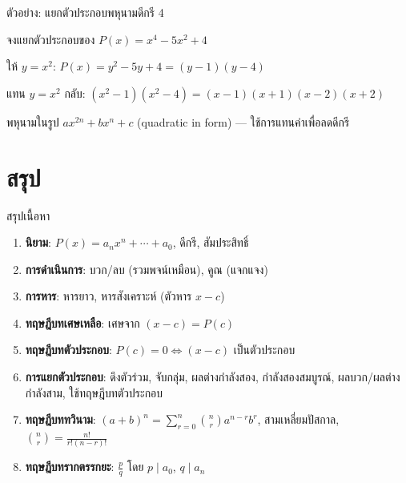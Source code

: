 \documentclass[11pt, aspectratio=169]{beamer}
\begin{document}
\begin{frame}{ตัวอย่าง: แยกตัวประกอบพหุนามดีกรี 4}
  \begin{exambox}[โจทย์]
    จงแยกตัวประกอบของ $P(x) = x^4 - 5x^2 + 4$
  \end{exambox}

  \begin{solbox}[วิธีทำ]
    ให้ $y = x^2$: \quad $P(x) = y^2 - 5y + 4 = (y-1)(y-4)$

    แทน $y = x^2$ กลับ: \quad $(x^2-1)(x^2-4) = (x-1)(x+1)(x-2)(x+2)$

  \end{solbox}

  \begin{intuition}[เทคนิค]
    พหุนามในรูป $ax^{2n} + bx^n + c$ (quadratic in form) — ใช้การแทนค่าเพื่อลดดีกรี
  \end{intuition}
\end{frame}

\section{สรุป}

\begin{frame}{สรุปเนื้อหา}
  \begin{explanation}[สิ่งที่ได้เรียนรู้]
    \begin{enumerate}
      \item \textbf{นิยาม}: $P(x) = a_nx^n + \cdots + a_0$, ดีกรี, สัมประสิทธิ์
      \item \textbf{การดำเนินการ}: บวก/ลบ (รวมพจน์เหมือน), คูณ (แจกแจง)
      \item \textbf{การหาร}: หารยาว, หารสังเคราะห์ (ตัวหาร $x-c$)
      \item \textbf{ทฤษฎีบทเศษเหลือ}: เศษจาก $(x-c) = P(c)$
      \item \textbf{ทฤษฎีบทตัวประกอบ}: $P(c)=0 \iff (x-c)$ เป็นตัวประกอบ
      \item \textbf{การแยกตัวประกอบ}: ดึงตัวร่วม, จับกลุ่ม, ผลต่างกำลังสอง,
            กำลังสองสมบูรณ์, ผลบวก/ผลต่างกำลังสาม, ใช้ทฤษฎีบทตัวประกอบ
      \item \textbf{ทฤษฎีบททวินาม}: $(a+b)^n = \sum_{r=0}^{n} \binom{n}{r}a^{n-r}b^r$,
            สามเหลี่ยมปัสกาล, $\binom{n}{r} = \frac{n!}{r!(n-r)!}$
      \item \textbf{ทฤษฎีบทรากตรรกยะ}: $\frac{p}{q}$ โดย $p \mid a_0$, $q \mid a_n$
    \end{enumerate}
  \end{explanation}
\end{frame}
\end{document}
